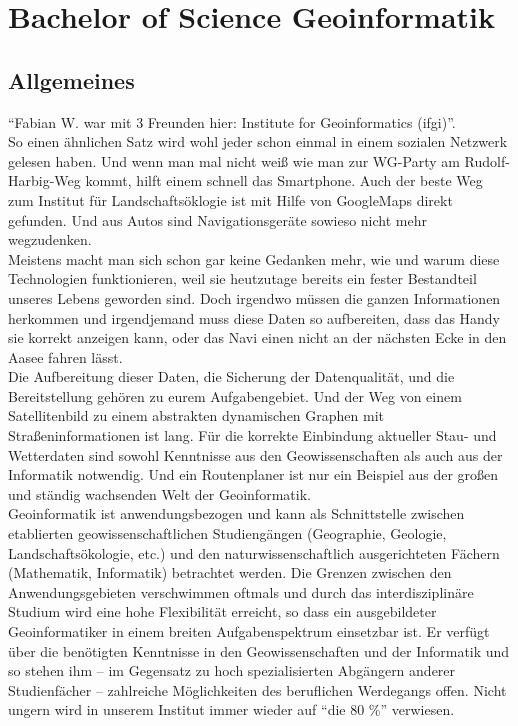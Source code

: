 \chapter{Bachelor of Science Geoinformatik}

\section{Allgemeines}

"`Fabian W. war mit 3 Freunden hier: Institute for Geoinformatics (ifgi)"'.\\
So einen ähnlichen Satz wird wohl jeder schon einmal in einem sozialen Netzwerk gelesen haben. Und wenn man mal nicht weiß wie man zur WG-Party am Rudolf-Harbig-Weg kommt, hilft einem schnell das Smartphone. Auch der beste Weg zum Institut für Landschaftsöklogie ist mit Hilfe von GoogleMaps direkt gefunden. Und aus Autos sind Navigationsgeräte sowieso nicht mehr wegzudenken.\\
Meistens macht man sich schon gar keine Gedanken mehr, wie und warum diese Technologien funktionieren, weil sie heutzutage bereits ein fester Bestandteil unseres Lebens geworden sind. Doch irgendwo müssen die ganzen Informationen herkommen und irgendjemand muss diese Daten so aufbereiten, dass das Handy sie korrekt anzeigen kann, oder das Navi einen nicht an der nächsten Ecke in den Aasee fahren lässt.\\
Die Aufbereitung dieser Daten, die Sicherung der Datenqualität, und die Bereitstellung gehören zu eurem Aufgabengebiet. Und der Weg von einem Satellitenbild zu einem abstrakten dynamischen Graphen mit Straßeninformationen ist lang. Für die korrekte Einbindung aktueller Stau- und Wetterdaten sind sowohl Kenntnisse aus den Geowissenschaften als auch aus der Informatik notwendig. Und ein Routenplaner ist nur ein Beispiel aus der großen und ständig wachsenden Welt der Geoinformatik.\\
Geoinformatik ist anwendungsbezogen und kann als Schnittstelle zwischen etablierten geowissenschaftlichen Studiengängen (Geographie, Geologie, Landschaftsökologie, etc.) und den naturwissenschaftlich ausgerichteten Fächern (Mathematik, Informatik) betrachtet werden. Die Grenzen zwischen den Anwendungsgebieten verschwimmen oftmals und durch das interdisziplinäre Studium wird eine hohe Flexibilität erreicht, so dass ein ausgebildeter Geoinformatiker in einem breiten Aufgabenspektrum einsetzbar ist. Er verfügt über die benötigten Kenntnisse in den Geowissenschaften und der Informatik und so stehen ihm -- im Gegensatz zu hoch spezialisierten Abgängern anderer Studienfächer -- zahlreiche Möglichkeiten des beruflichen Werdegangs offen. Nicht ungern wird in unserem Institut immer wieder auf "`die 80 \%"' verwiesen.\\
